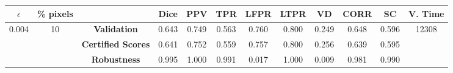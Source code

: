 \begin{longtable}{ c  c | c | c  c  c  c  c  c  c c c}
\toprule \textbf{$\epsilon$} & \textbf{\% pixels} & & \textbf{Dice} & \textbf{PPV} & \textbf{TPR} & \textbf{LFPR} & \textbf{LTPR} & \textbf{VD} & \textbf{CORR} & \textbf{SC} & \textbf{V. Time} \\
\midrule 
\multirow{3}{*}{0.004}  & \multirow{3}{*}{10} &\textbf{Validation} & 0.643 & 0.749 & 0.563 & 0.760 & 0.800 & 0.249 & 0.648 & 0.596 & \multirow{3}{*}{12308} \\
 & & \textbf{Certified Scores} & 0.641 & 0.752 & 0.559 & 0.757 & 0.800 & 0.256 & 0.639 & 0.595 & \\
& & \textbf{Robustness} & 0.995 & 1.000 & 0.991 & 0.017 & 1.000 & 0.009 & 0.981 & 0.990 & \\
\end{longtable}